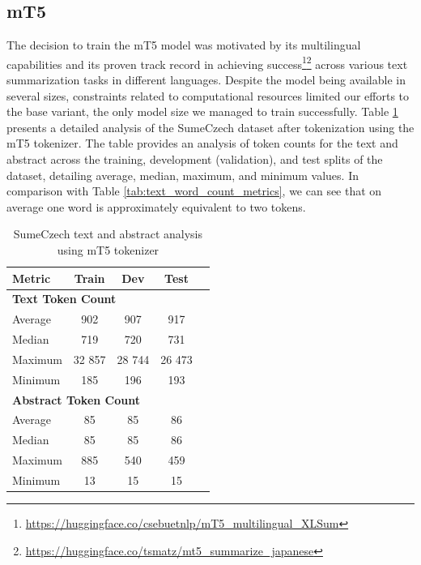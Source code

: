 \documentclass[english, ba, kiv, he, iso690numb, pdf, viewonly]{fasthesis}
\begin{document}
\subsection{mT5} \label{impl:mt5}
The decision to train the mT5 model was motivated by its multilingual capabilities and its proven track record in achieving success\footnote{\url{https://huggingface.co/csebuetnlp/mT5_multilingual_XLSum}}\footnote{\url{https://huggingface.co/tsmatz/mt5_summarize_japanese}} across various text summarization tasks in different languages. Despite the model being available in several sizes, constraints related to computational resources limited our efforts to the base variant, the only model size we managed to train successfully. Table \ref{tab:tokenized_text_abstract_metrics} presents a detailed analysis of the SumeCzech dataset after tokenization using the mT5 tokenizer. The table provides an analysis of token counts for the text and abstract across the training, development (validation), and test splits of the dataset, detailing average, median, maximum, and minimum values. In comparison with Table \ref{tab:text_word_count_metrics}, we can see that on average one word is approximately equivalent to two tokens.

\begin{table}[htbp]
    \centering
    \caption{SumeCzech text and abstract analysis using mT5 tokenizer}
    \label{tab:tokenized_text_abstract_metrics}
    \begin{tabular}{lcccc}
        \toprule
        \textbf{Metric} & {\textbf{Train}} & {\textbf{Dev}} & {\textbf{Test}} \\
        \midrule
        \multicolumn{4}{l}{\textbf{Text Token Count}} \\
        \midrule
        Average & 902 & 907 & 917 \\
        Median & 719 & 720 & 731 \\
        Maximum & 32 857 & 28 744 & 26 473 \\
        Minimum & 185 & 196 & 193 \\
        \midrule
        \multicolumn{4}{l}{\textbf{Abstract Token Count}} \\
        \midrule
        Average & 85 & 85 & 86 \\
        Median & 85 & 85 & 86 \\
        Maximum & 885 & 540 & 459 \\
        Minimum & 13 & 15 & 15 \\
        \bottomrule
    \end{tabular}
\end{table}
\end{document}
